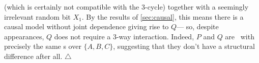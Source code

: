     (which is certainly not compatible with the 3-cycle)
together with a seemingly irrelevant random bit $X_1$.
By the results of \cref{sec:causal},
this means there is a causal model without joint dependence giving rise to $Q$---%
    so,
    despite appearances,
    $Q$ does not 
    require a 3-way interaction.
    Indeed, $P$ and $Q$ are \scible\ with precisely the same \hgraph s over $\{A,B,C\}$, 
    suggesting that they don't have a structural difference after all. 
\hfill$\triangle$


